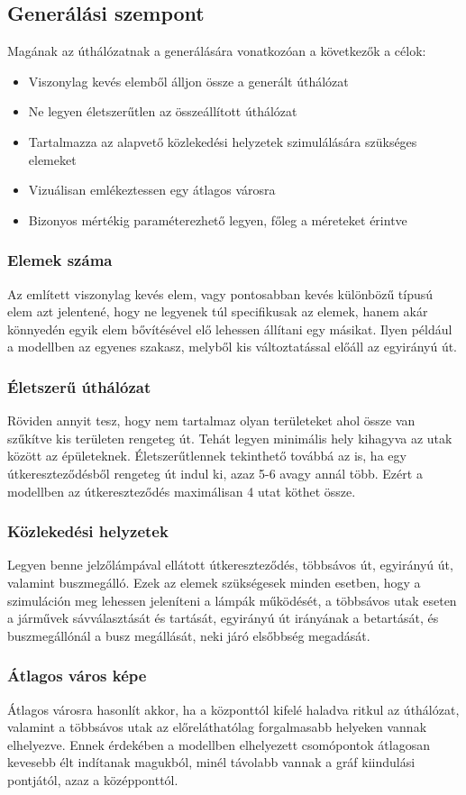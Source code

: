 \subsection{Generálási szempont}
Magának az úthálózatnak a generálására vonatkozóan a következők a célok:
\begin{itemize}
\item Viszonylag kevés elemből álljon össze a generált úthálózat
\item Ne legyen életszerűtlen az összeállított úthálózat
\item Tartalmazza az alapvető közlekedési helyzetek szimulálására szükséges elemeket
\item Vizuálisan emlékeztessen egy átlagos városra
\item Bizonyos mértékig paraméterezhető legyen, főleg a méreteket érintve
\end{itemize}
\subsubsection{Elemek száma}
Az említett viszonylag kevés elem, vagy pontosabban kevés különbözű típusú elem azt jelentené, hogy ne legyenek túl specifikusak az elemek, hanem akár könnyedén egyik elem bővítésével elő lehessen állítani egy másikat. Ilyen például a modellben az egyenes szakasz, melyből kis változtatással előáll az egyirányú út.
\subsubsection{Életszerű úthálózat}
Röviden annyit tesz, hogy nem tartalmaz olyan területeket ahol össze van szűkítve kis területen rengeteg út. Tehát legyen minimális hely kihagyva az utak között az épületeknek. Életszerűtlennek tekinthető továbbá az is, ha egy útkereszteződésből rengeteg út indul ki, azaz 5-6 avagy annál több. Ezért a modellben az útkereszteződés maximálisan 4 utat köthet össze.
\subsubsection{Közlekedési helyzetek}
Legyen benne jelzőlámpával ellátott útkereszteződés, többsávos út, egyirányú út, valamint buszmegálló. Ezek az elemek szükségesek minden esetben, hogy a szimuláción meg lehessen jeleníteni a lámpák működését, a többsávos utak eseten a járművek sávválasztását és tartását, egyirányú út irányának a betartását, és buszmegállónál a busz megállását, neki járó elsőbbség megadását.
\subsubsection{Átlagos város képe}
Átlagos városra hasonlít akkor, ha a központtól kifelé haladva ritkul az úthálózat, valamint a többsávos utak az előreláthatólag forgalmasabb helyeken vannak elhelyezve. Ennek érdekében a modellben elhelyezett csomópontok átlagosan kevesebb élt indítanak magukból, minél távolabb vannak a gráf kiindulási pontjától, azaz a középponttól.
